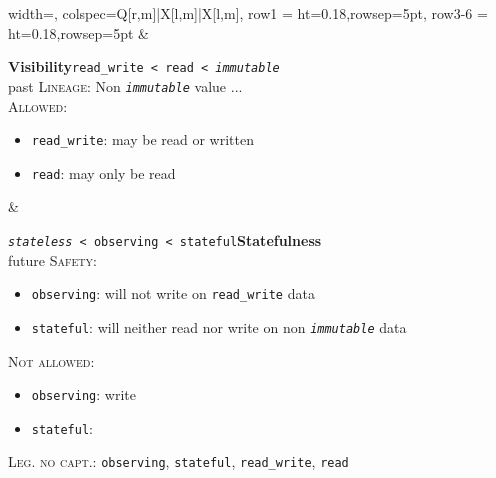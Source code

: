 \documentclass{article}
\begin{document}
\begin{center}
\begin{tblr}{
  width=\textwidth, %
  colspec={Q[r,m]|X[l,m]|X[l,m]},
  row{1}   = {ht=0.18\textheight,rowsep=5pt},
  row{3-6} = {ht=0.18\textheight,rowsep=5pt}
}
& {
\begin{minipage}[c][0.18\textheight][s]{\linewidth}
  {\large\bfseries Visibility}\hfill{\small\texttt{read\_write < read < \textit{immutable}}}\\
  {\footnotesize past}
  \vfill
  \textsc{Lineage}: Non \texttt{\textit{immutable}} value ... \\
  \textsc{Allowed}:
  \begin{itemize}
    \item\texttt{read\_write}: may be read or written
    \item\texttt{read}: may only be read
  \end{itemize}
\end{minipage}
} & {
\begin{minipage}[c][0.18\textheight][s]{\linewidth}
  {\small\texttt{\textit{stateless} < observing < stateful}}\hfill{\large\bfseries Statefulness}\\
  {\footnotesize\null\hfill future}
  \vfill
  \textsc{Safety}:
  \begin{itemize}
    \item\texttt{observing}: will not write on \texttt{read\_write} data
    \item\texttt{stateful}: will neither read nor write on non \texttt{\textit{immutable}} data
  \end{itemize}
  \textsc{Not allowed}:
  \begin{itemize}
    \item\texttt{observing}: write
    \item\texttt{stateful}: 
  \end{itemize}
  \textsc{Leg. no capt.}: \texttt{observing}, \texttt{stateful}, \texttt{read\_write}, \texttt{read} \\
\end{minipage}
}

\end{tblr}
\end{center} %
\end{document}

